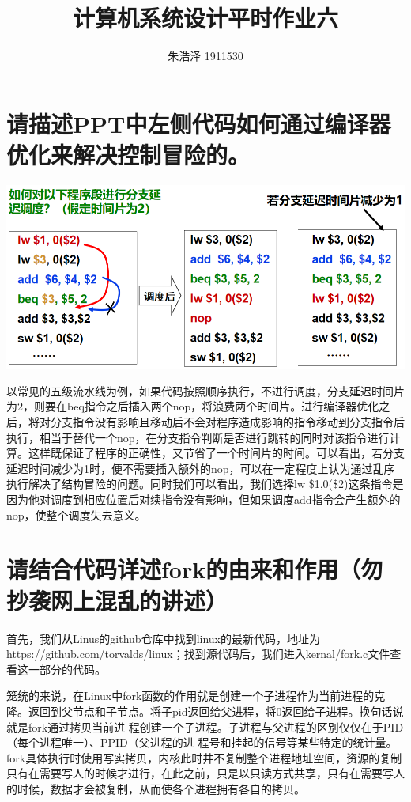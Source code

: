 \documentclass{article}
\begin{document}
\title{计算机系统设计平时作业六}
\author{朱浩泽 1911530}
\maketitle
\section{请描述PPT中左侧代码如何通过编译器优化来解决控制冒险的。}
\large
\begin{center}
   \includegraphics*[scale = 0.5]{WechatIMG610 1}
\end{center}
以常见的五级流水线为例，如果代码按照顺序执行，不进行调度，分支延迟时间片为2，则要在beq指令之后插入两个nop，将浪费两个时间片。进行编译器优化之后，将对分支指令没有影响且移动后不会对程序造成影响的指令移动到分支指令后执行，相当于替代一个nop，在分支指令判断是否进行跳转的同时对该指令进行计算。这样既保证了程序的正确性，又节省了一个时间片的时间。可以看出，若分支延迟时间减少为1时，便不需要插入额外的nop，可以在一定程度上认为通过乱序执行解决了结构冒险的问题。同时我们可以看出，我们选择lw \$1,0(\$2)这条指令是因为他对调度到相应位置后对续指令没有影响，但如果调度add指令会产生额外的nop，使整个调度失去意义。





\section{请结合代码详述fork的由来和作用（勿抄袭网上混乱的讲述）}
首先，我们从Linus的github仓库中找到linux的最新代码，地址为https://github.com/torvalds/linux；找到源代码后，我们进入kernal/fork.c文件查看这一部分的代码。

笼统的来说，在Linux中fork函数的作用就是创建一个子进程作为当前进程的克隆。返回到父节点和子节点。将子pid返回给父进程，将0返回给子进程。换句话说就是fork通过拷贝当前进
程创建一个子进程。子进程与父进程的区别仅仅在于PID（每个进程唯一）、PPID（父进程的进
程号和挂起的信号等某些特定的统计量。fork具体执行时使用写实拷贝，内核此时井不复制整个进程地址空间，资源的复制只有在需要写人的时候才进行，在此之前，只是以只读方式共享，只有在需要写人的时候，数据才会被复制，从而使各个进程拥有各自的拷贝。
\end{document}
